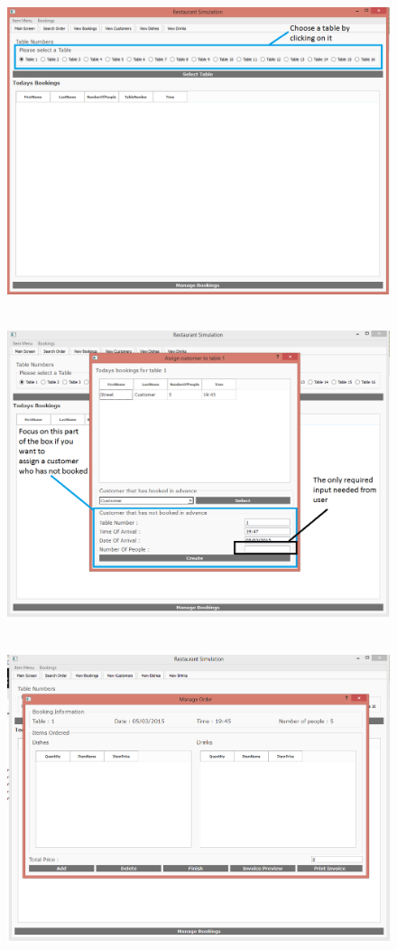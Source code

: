 \begin{figure}[H]
    \includegraphics[height = 9cm]{./Manual/images/AssignCust1} 
    \caption{} \label{fig:assigncust1}
\end{figure}

\begin{figure}[H]
    \includegraphics[height = 9cm]{./Manual/images/AssignCust2} 
    \caption{} \label{fig:assigncust2}
\end{figure}

\begin{figure}[H]
    \includegraphics[height = 9cm]{./Manual/images/base/ManageOrder} 
    \caption{} \label{fig:assigncust3}
\end{figure}

